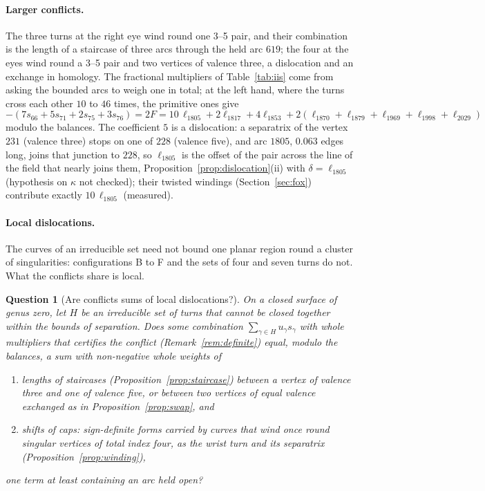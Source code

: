 \documentclass[11pt,a4paper]{article}
\newtheorem{question}{Question}
\newcommand{\shift}{s}
\begin{document}
\paragraph{Larger conflicts.}
The three turns at the right eye wind round one 3--5 pair, and their
combination is the length of a staircase of three arcs through the held arc
$619$; the four at the eyes wind round a 3--5 pair and two vertices of valence
three, a dislocation and an exchange in homology. The fractional multipliers of Table~\ref{tab:iis} come
from asking the bounded arcs to weigh one in total; at the left hand, where
the turns cross each other $10$ to $46$ times, the primitive ones give
\[
  -(7\shift_{66} + 5\shift_{71} + 2\shift_{75} + 3\shift_{76}) = 2F =
  10\,\ell_{1805} + 2\ell_{1817} + 4\ell_{1853} + 2(\ell_{1870} + \ell_{1879}
  + \ell_{1969} + \ell_{1998} + \ell_{2029})
\]
modulo the balances. The coefficient $5$ is a dislocation: a separatrix of the
vertex $231$ (valence three) stops on one of $228$ (valence five), and arc
$1805$, $0.063$ edges long, joins that junction to $228$, so $\ell_{1805}$ is
the offset of the pair across the line of the field that nearly joins them,
Proposition~\ref{prop:dislocation}(ii) with $\delta = \ell_{1805}$ (hypothesis
on $\kappa$ not checked); their
twisted windings (Section~\ref{sec:fox}) contribute exactly $10\,\ell_{1805}$
(measured).

\paragraph{Local dislocations.}
The curves of an irreducible set need not bound one planar region round a
cluster of singularities: configurations B to F and the sets of four and seven
turns do not. What the conflicts share is local.

\begin{question}[Are conflicts sums of local dislocations?]\label{conj:local}
On a closed surface of genus zero, let $H$ be an irreducible set of turns that
cannot be closed together within the bounds of separation. Does some
combination $\sum_{\gamma \in H} u_\gamma \shift_\gamma$ with whole
multipliers that certifies the conflict (Remark~\ref{rem:definite}) equal,
modulo the balances, a sum with non-negative whole weights of
\begin{enumerate}
\item[(i)] lengths of staircases (Proposition~\ref{prop:staircase}) between a
  vertex of valence three and one of valence five, or between two vertices of
  equal valence exchanged as in Proposition~\ref{prop:swap}, and
\item[(ii)] shifts of caps: sign-definite forms carried by curves that wind
  once round singular vertices of total index four, as the wrist turn and its
  separatrix (Proposition~\ref{prop:winding}),
\end{enumerate}
one term at least containing an arc held open?
\end{question}
\end{document}

